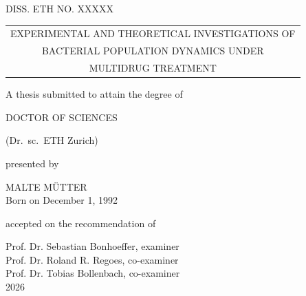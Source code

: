 
\begin{titlingpage}
  \hfill
  \begin{minipage}{\linewidth}
    \begin{center}

      DISS. ETH NO. XXXXX

      \vspace*{2cm}

      {\LARGE
        \begin{tabular}{@{}c@{}}
          EXPERIMENTAL AND THEORETICAL INVESTIGATIONS OF \\
          BACTERIAL POPULATION DYNAMICS UNDER \\
          MULTIDRUG TREATMENT
      \end{tabular}}

      \vspace*{3cm}
      A thesis submitted to attain the degree of

      \uppercase{Doctor of Sciences}

      (Dr.\ sc.\ ETH Zurich)

      \vspace*{1cm}

      presented by

      \vspace*{1cm}

      \uppercase{Malte Mütter} \\
      Born on December 1, 1992 \\

      \vspace*{3cm}

      accepted on the recommendation of
      \vspace{5mm}

      Prof. Dr. Sebastian Bonhoeffer, examiner \\
      Prof. Dr. Roland R. Regoes, co-examiner \\
      Prof. Dr. Tobias Bollenbach, co-examiner \\

      \vspace*{2cm}
      2026

    \end{center}
  \end{minipage}
\end{titlingpage}
